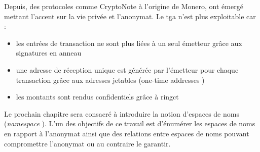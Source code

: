 Depuis, des protocoles comme CryptoNote\cite{monero_wp} à l'origine de Monero, ont émergé 
mettant l'accent sur la vie privée et l'anonymat. Le \acrshort{tga} n'est plus exploitable car : 
\begin{itemize}
    \item les entrées de transaction ne sont plus liées à un seul émetteur grâce 
    aux signatures en anneau 
    \item une adresse de réception unique est générée par l'émetteur pour chaque transaction grâce
    aux adresses jetables (\og one-time addresses \fg)
    \item les montants sont rendus confidentiels grâce à \acrshort{ringct}
\end{itemize}

\medskip 
\noindent
Le prochain chapitre sera consacré à introduire la notion d'espaces de noms (\og \textit{namespace} \fg).
L'un des objectifs de ce travail est d'énumérer les espaces de noms en rapport à l'anonymat 
ainsi que des relations entre espaces de noms pouvant compromettre l'anonymat ou au contraire 
le garantir.